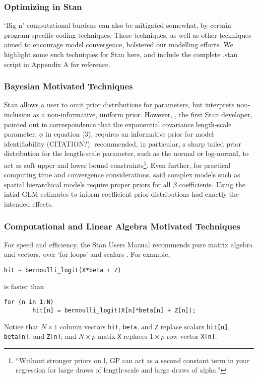 \subsubsection{Optimizing in Stan} %
`Big n' computational burdens can also be mitigated somewhat, by certain program specific coding techniques. These techniques, as well as other techniques aimed to encourage model convergence, bolstered our modelling efforts. We highlight some such techniques for Stan here, and include the complete .stan script in Appendix A for reference. 

\subsubsection*{Bayesian Motivated Techniques} %

Stan allows a user to omit prior distributions for parameters, but interprets non-inclusion as a non-informative, uniform prior. However, \cite{Gelman}, the first Stan developer, pointed out in correspondence that the exponential covariance length-scale parameter, $\phi$ in equation (3), requires an informative prior for model identifiability (CITATION?). \cite{Trangucci} recommended, in particular, a sharp tailed prior distribution for the length-scale parameter, such as the normal or log-normal, to act as soft upper and lower bound constraints\footnote{``Without stronger priors on l, GP can act as a second constant term in your regression for large draws of length-scale and large draws of alpha.''}. Even further, for practical computing time and convergence considerations, \cite{Trangucci} said complex models such as spatial hierarchical models require proper priors for all $\beta$ coefficients. Using the intial GLM estimates to inform coefficient prior distributions had exactly the intended effects.

\subsubsection*{Computational and Linear Algebra Motivated Techniques} %
For speed and efficiency, the Stan Users Manual recommends pure matrix algebra and vectors, over `for loops' and scalars \cite{StantheMAN}. For example, 
\begin{verbatim}
hit ~ bernoulli_logit(X*beta + Z)
\end{verbatim}
is faster than
\begin{verbatim}
for (n in 1:N)
        hit[n] = bernoulli_logit(X[n]*beta[n] + Z[n]);
\end{verbatim}
Notice that $N \times 1$ column vectors \verb|hit|, \verb|beta|, and \verb|Z| replace scalars \verb|hit[n]|, \verb|beta[n]|, and \verb|Z[n]|; and $N \times p$ matix \verb|X| replaces $1 \times p$ row vector \verb|X[n]|.

